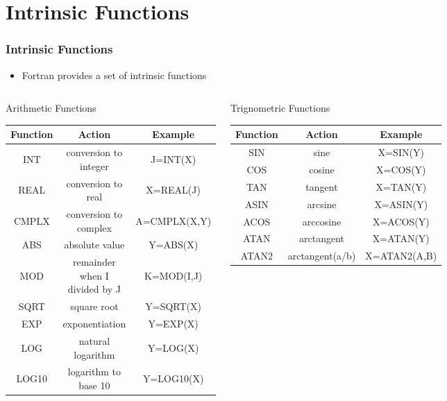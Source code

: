 \documentclass[slidestop,mathserif,compress,xcolor=svgnames]{beamer}
\begin{document}
\section{Intrinsic Functions}
\begin{frame}[t]
  \frametitle{\small Intrinsic Functions}
  \begin{itemize}
    \item Fortran provides a set of intrinsic functions
  \end{itemize}
  \begin{columns}
    \column{6cm}
    {\tiny
      \begin{block}{\scriptsize Arithmetic Functions}
        \begin{center}
          \begin{tabular}{ccc}
            Function & Action & Example \\
            \hline
            INT & conversion to integer & J=INT(X) \\
            REAL & conversion to real & X=REAL(J) \\
            CMPLX & conversion to complex & A=CMPLX(X,Y) \\
            ABS & absolute value & Y=ABS(X) \\
            MOD & remainder when I divided by J & K=MOD(I,J) \\
            SQRT & square root & Y=SQRT(X) \\
            EXP & exponentiation & Y=EXP(X) \\
            LOG & natural logarithm & Y=LOG(X) \\
            LOG10 & logarithm to base 10 & Y=LOG10(X) \\
            \hline
          \end{tabular}
        \end{center}
      \end{block}
    }
    \column{5cm}
    {\tiny
      \begin{block}{\scriptsize Trignometric Functions}
        \begin{center}
          \begin{tabular}{ccc}
            Function & Action & Example \\
            \hline
            SIN & sine & X=SIN(Y) \\
            COS & cosine & X=COS(Y) \\
            TAN & tangent & X=TAN(Y) \\
            ASIN & arcsine & X=ASIN(Y) \\
            ACOS & arccosine & X=ACOS(Y) \\
            ATAN & arctangent & X=ATAN(Y) \\
            ATAN2 & arctangent(a/b) & X=ATAN2(A,B) \\
            \hline
          \end{tabular}
        \end{center}
      \end{block}
    }
  \end{columns}
\end{frame}
\end{document}
